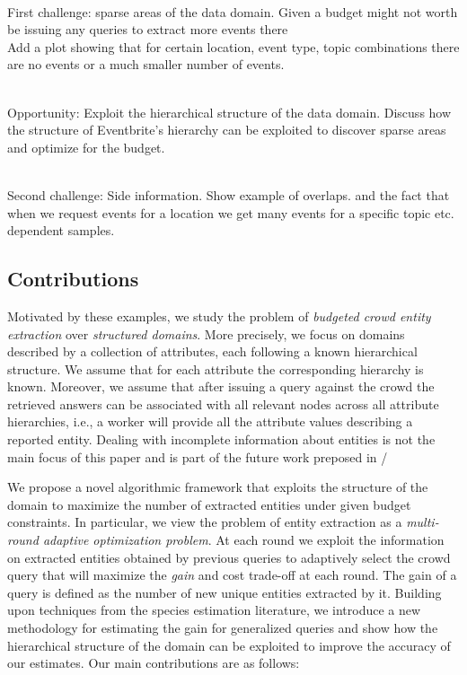 \documentclass{sig-alternate}
\begin{document}
\ \\First challenge: sparse areas of the data domain. Given a budget might not worth be issuing any queries to extract more events there
\ \\Add a plot showing that for certain location, event type, topic combinations there are no events or a much smaller number of events. 

\ \\Opportunity: Exploit the hierarchical structure of the data domain. Discuss how the structure of Eventbrite's hierarchy can be exploited to discover sparse areas and optimize for the budget.

\ \\Second challenge: Side information. Show example of overlaps. and the fact that when we request events for a location we get many events for a specific topic etc. dependent samples.

\subsection{Contributions}
\label{sec:contributions}
Motivated by these examples, we study the problem of {\em budgeted crowd entity extraction} over {\em structured domains}. More precisely, we focus on domains described by a collection of attributes, each following a known hierarchical structure. We assume that for each attribute the corresponding hierarchy is known. Moreover, we assume that after issuing a query against the crowd the retrieved answers can be associated with all relevant nodes across all attribute hierarchies, i.e., a worker will provide all the attribute values describing a reported entity. Dealing with incomplete information about entities is not the main focus of this paper and is part of the future work preposed in /

We propose a novel algorithmic framework that exploits the structure of the domain to maximize the number of extracted entities under given budget constraints. In particular, we view the problem of entity extraction as a {\em multi-round adaptive optimization problem}. At  each round we exploit the information on extracted entities obtained by previous queries to adaptively select the crowd query that will maximize the {\em gain} and cost trade-off at each round. The gain of a query is defined as the number of new unique entities extracted by it. Building upon techniques from the species estimation literature, we introduce a new methodology for estimating the gain for generalized queries and show how the hierarchical structure of the domain can be exploited to improve the accuracy of our estimates. Our main contributions are as follows:
\end{document}

